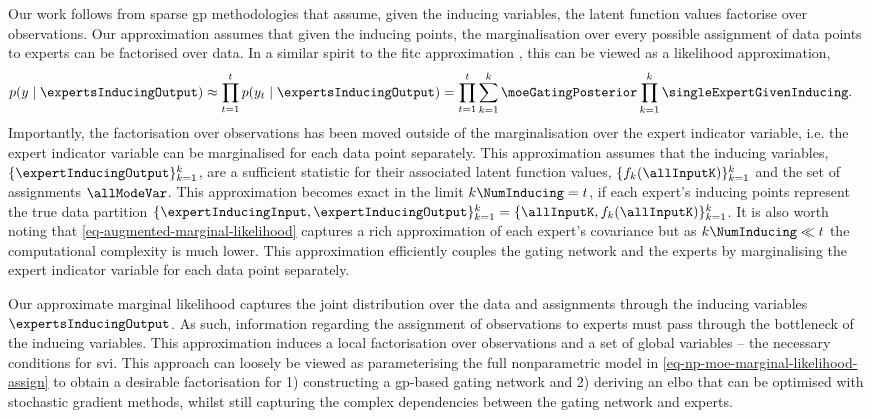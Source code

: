 \documentclass{mimosis-class/mimosis}
\numberwithin{equation}{chapter}
\newcommand{\numData}{\ensuremath{t}}
\newcommand{\modeInd}{\ensuremath{k}}
\newcommand{\NumData}{\ensuremath{\MakeUppercase{\numData}}}
\newcommand{\ModeInd}{\ensuremath{\MakeUppercase{\modeInd}}}
\newcommand{\singleData}[1]{\ensuremath{#1_{\numData}}}
\newcommand{\allData}[1]{\ensuremath{\MakeUppercase{#1}}}
\newcommand{\mode}[1]{\ensuremath{#1_{\modeInd}}}
\newcommand{\y}{\ensuremath{y}}
\newcommand{\singleOutput}{\ensuremath{\singleData{\y}}}
\newcommand{\allOutput}{\ensuremath{\allData{\y}}}
\newcommand{\latentFunc}{\ensuremath{f}}
\begin{document}
{Our work follows from sparse \acrshort{gp} methodologies that assume,
given the inducing variables, the latent function values factorise over observations.
Our approximation assumes that given the inducing points,
the marginalisation over every possible assignment of data points to experts can be factorised over data.
In a similar spirit to the \acrfull{fitc} approximation \citep{naish-guzmanGeneralized2008,quinonero-candelaUnifying2005},
this can be viewed as a likelihood approximation,
\begin{align} \label{eq-likelihood-approximation}
p(\allOutput \mid \expertsInducingOutput)
&\approx \prod_{\numData=1}^{\NumData} p(\singleOutput \mid \expertsInducingOutput)
= \prod_{\numData=1}^{\NumData} \sum_{\modeInd=1}^{\ModeInd} \moeGatingPosterior
\prod_{\modeInd=1}^{\ModeInd} \singleExpertGivenInducing.
\end{align}
Importantly, the factorisation over observations has been moved
outside of the marginalisation over the expert indicator variable, i.e.
the expert indicator variable can be marginalised for each data point separately.
This approximation assumes that the inducing variables,
\(\{\expertInducingOutput\}_{\modeInd=1}^\ModeInd\), are
a sufficient statistic for their associated latent function values,
\(\{\mode{\latentFunc}(\allInputK) \}_{\modeInd=1}^\ModeInd\)
and the set of assignments \(\allModeVar\).
This approximation becomes exact in the limit \(\ModeInd\NumInducing=\NumData\),
if each expert's inducing points represent the true data partition
\(\{\expertInducingInput, \expertInducingOutput\}_{\modeInd=1}^{\ModeInd} = \{\allInputK, \mode{\latentFunc}(\allInputK)\}_{\modeInd=1}^{\ModeInd}\).
It is also worth noting that \cref{eq-augmented-marginal-likelihood} captures a rich approximation of each
expert's covariance but as \(\ModeInd\NumInducing \ll \NumData\) the computational complexity is
much lower.
This approximation efficiently couples the gating network and the experts by marginalising the expert
indicator variable for each data point separately.

Our approximate marginal likelihood captures
the joint distribution over the data and assignments through the inducing variables
\(\expertsInducingOutput\).
As such, information regarding the assignment of observations to experts must pass through the bottleneck of the
inducing variables.
This approximation induces a local factorisation over observations and a set of global variables
-- the necessary conditions for \acrshort{svi}.
This approach can loosely be viewed as parameterising the full nonparametric model
in \cref{eq-np-moe-marginal-likelihood-assign} to obtain a desirable
factorisation for 1) constructing a \acrshort{gp}-based gating network and 2) deriving an \acrshort{elbo} that can
be optimised with stochastic gradient methods,
whilst still capturing the complex dependencies between the gating network and experts.
}
\end{document}
